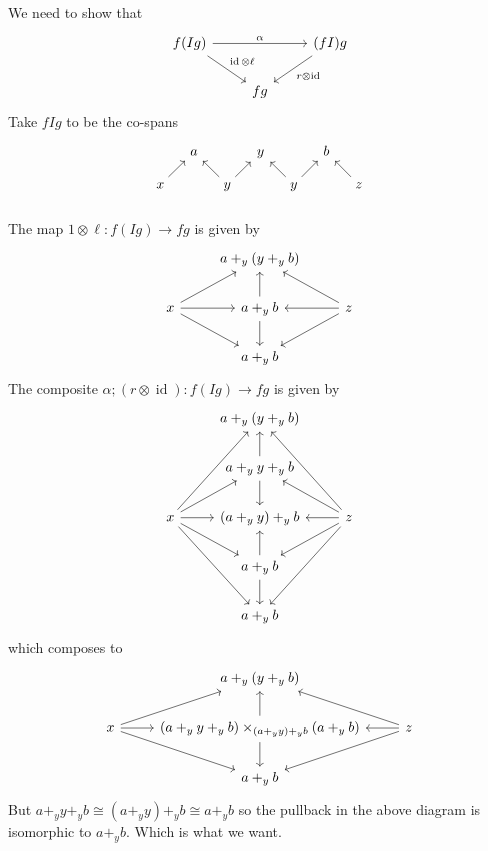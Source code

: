 \documentclass[12pt]{article}
\newcommand{\from}{\colon}
\renewcommand{\(}{\left(}
\renewcommand{\)}{\right)}
\renewcommand{\{}{\left\lbrace}
\renewcommand{\}}{\right\rbrace}
\DeclareMathOperator{\id}{id}
\theoremstyle{remark}
\theoremstyle{definition}
\begin{document}
We need to show that
\[
	\begin{tikzcd}
		{f(Ig)} 
			\ar[rr,"\alpha"]
			\ar[rd,"\id \otimes \ell"] &
		{} &
		{(fI)g} 
			\ar[ld, "r \otimes \id"]\\
		{} &
		{fg} &
		{}
	\end{tikzcd}
\]
Take $fIg$ to be the co-spans
\[
	\begin{tikzcd}[column sep = 1em,row sep=1em]
		{} &
		{a} &
		{} &
		{y} &
		{} &
		{b} &
		{} \\
		{x} 
			\ar[ur]&
		{} &
		{y} 
			\ar[ur]
			\ar[ul]&
		{} &
		{y} 
			\ar[ur]
			\ar[ul]&
		{} &
		{z}
			\ar[ul]\\
	\end{tikzcd}
\]
The map $1 \otimes \ell \from f(Ig) \to fg$ is given by
\[
	\begin{tikzcd}
		{} &
		{a +_y (y +_y b)} &
		{} \\
		{x} 
			\ar[ur] 
			\ar[r]
			\ar[dr] &
		{a +_y b} 
			\ar[u]
			\ar[d] &
		{z} 
			\ar[ul]
			\ar[l]
			\ar[dl] \\
		{} &
		{a +_y b} &
		{}
	\end{tikzcd}
\]
The composite $\alpha ; (r \otimes \id) \from f(Ig) \to fg$ is given by 
\[
	\begin{tikzcd}
		{} &
		{a+_y(y+_yb)} &
		{} \\
		{} &
		{a+_y y+_yb} 
			\ar[u]
			\ar[d] &
		{} \\
		{x} 
			\ar[ruu] 
			\ar[ru]
			\ar[r]
			\ar[rd]
			\ar[rdd] &
		{(a+_y y)+_yb} &
		{z} 
			\ar[luu] 
			\ar[lu]
			\ar[l]
			\ar[ld]
			\ar[ldd]\\
			{} &
		{a+_yb} 
			\ar[u]
			\ar[d] &
		{} \\
		{} &
		{a+_yb} &
		{}
	\end{tikzcd}
\]
which composes to
\[
	\begin{tikzcd}
		{} &
		{a +_y (y +_y b)} &
		{} \\
		{x} 
			\ar[ur] 
			\ar[r]
			\ar[dr] &
		{(a +_y y +_y b) \times_{(a+_yy)+_yb} (a+_yb)} 
			\ar[u]
			\ar[d] &
		{z} 
			\ar[ul]
			\ar[l]
			\ar[dl] \\
		{} &
		{a +_y b} &
		{}
	\end{tikzcd}
\]
But $a+_y y +_y b \cong (a+_y y) +_y b \cong a+_y b$ so  the pullback in the above diagram is isomorphic to $a+_yb$. Which is what we want.

\end{document}
